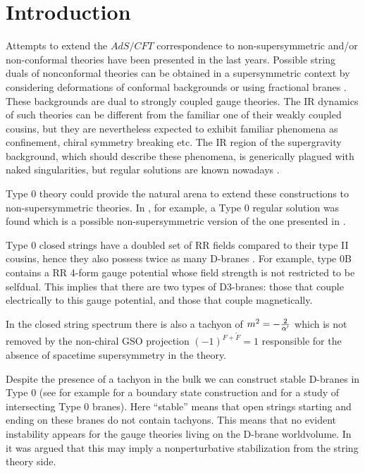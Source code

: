 \documentclass[a4paper,12pt]{article}
\begin{document}
\section{Introduction}
Attempts to extend the $AdS/CFT$ correspondence to non-supersymmetric and/or
non-conformal theories have been presented in the last years. Possible string duals of nonconformal theories can be obtained in a supersymmetric context by considering deformations of conformal backgrounds
 \cite{gppz,freed} or using fractional branes \cite{kn,ktfrac,ks,mn}. These backgrounds are dual to strongly coupled gauge theories. The IR dynamics of such theories can be different from the familiar one of their weakly coupled cousins, 
but they are nevertheless expected to exhibit familiar phenomena as 
confinement, chiral symmetry breaking etc. The IR region of the 
supergravity background, which should describe these phenomena, is
generically plagued with naked singularities, but regular solutions
are known nowadays \cite{ks}.
 
Type 0 theory could provide the natural arena to extend these constructions to
non-supersymmetric theories. In \cite{bgz}, for example, a Type 0 regular 
solution was found which is a possible non-supersymmetric version of the one 
presented in \cite{ks}.

Type 0 closed strings have a doubled set of RR fields compared to their type II cousins, 
hence they also possess twice as many D-branes \cite{kt}. For example,  type 0B
contains a RR  4-form gauge potential whose field strength is not restricted to be
selfdual. This implies that there are two types of D3-branes: 
those that couple electrically to this gauge potential, and those that couple 
magnetically.

In the closed string spectrum there is also a tachyon of 
$m^2=-{2\over\alpha'}$ which is not removed by the non-chiral GSO 
projection $(-1)^{F+\tilde F}=1$ responsible for the absence of spacetime supersymmetry in the theory.

Despite the presence of a tachyon in the bulk we can 
construct stable D-branes in Type 0 (see for example \cite{berg} for a boundary state
construction and \cite{costa} for a study of intersecting Type 0 branes). Here ``stable'' means that open strings starting
and ending on these branes do not contain tachyons. This means that no evident
instability appears for the  gauge theories living on the D-brane worldvolume. In \cite{kt1,k} it was argued that this may imply a nonperturbative stabilization from the string theory side. 
\end{document}
